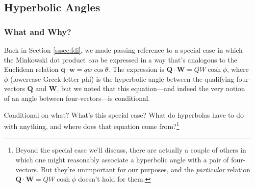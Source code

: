 \documentclass[12pt]{article}
\renewcommand{\vv}[1]{\mathbf{#1}}
\begin{document}
\subsection{Hyperbolic Angles}\label{ssec:ra}

\subsubsection{What and Why?}

Back in Section \ref{sssec:fdi}, we made passing reference to a special case in which the Minkowski dot product \emph{can} be expressed in a way that's analogous to the Euclidean relation $\vv q \cdot \vv w = qw \cos \theta$. The expression is $\vv Q \cdot \vv W = QW \cosh \phi$, where $\phi$ (lowercase Greek letter phi) is the hyperbolic angle between the qualifying four-vectors $\vv Q$ and $\vv W$, but we noted that this equation---and indeed the very notion of an angle between four-vectors---is conditional.

Conditional on what? What's this special case? What do hyperbolas have to do with anything, and where does that equation come from?\footnote{Beyond the special case we'll discuss, there are actually a couple of others in which one might reasonably associate a hyperbolic angle with a pair of four-vectors. But they're unimportant for our purposes, and the \emph{particular} relation $\vv Q \cdot \vv W = QW \cosh \phi$ doesn't hold for them.}
\end{document}
